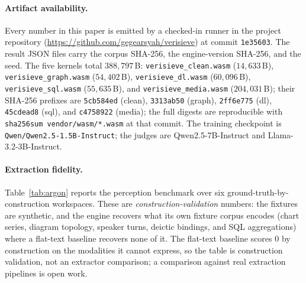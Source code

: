 \documentclass{article}
\begin{document}
\paragraph{Artifact availability.}
Every number in this paper is emitted by a checked-in runner in the project repository (\url{https://github.com/gegearsyah/verisieve}) at commit \texttt{1e35603}. The result JSON files carry the corpus SHA-256, the engine-version SHA-256, and the seed. The five kernels total $388{,}797$\,B: \texttt{verisieve\_clean.wasm} ($14{,}633$\,B), \texttt{verisieve\_graph.wasm} ($54{,}402$\,B), \texttt{verisieve\_dl.wasm} ($60{,}096$\,B), \texttt{verisieve\_sql.wasm} ($55{,}635$\,B), and \texttt{verisieve\_media.wasm} ($204{,}031$\,B); their SHA-256 prefixes are \texttt{5cb584ed} (clean), \texttt{3313ab50} (graph), \texttt{2ff6e775} (dl), \texttt{45cdead8} (sql), and \texttt{c4758922} (media); the full digests are reproducible with \texttt{sha256sum vendor/wasm/*.wasm} at that commit. The training checkpoint is \texttt{Qwen/Qwen2.5-1.5B-Instruct}; the judges are Qwen2.5-7B-Instruct and Llama-3.2-3B-Instruct.

\paragraph{Extraction fidelity.}
Table~\ref{tab:argon} reports the perception benchmark over six ground-truth-by-construction workspaces. These are \emph{construction-validation} numbers: the fixtures are synthetic, and the engine recovers what its own fixture corpus encodes (chart series, diagram topology, speaker turns, deictic bindings, and SQL aggregations) where a flat-text baseline recovers none of it. The flat-text baseline scores 0 by construction on the modalities it cannot express, so the table is construction validation, not an extractor comparison; a comparison against real extraction pipelines is open work.
\end{document}
